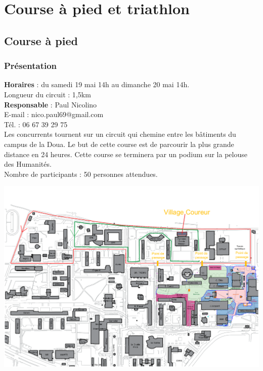 \documentclass[hidelinks, paper=a4, fontsize=13pt]{report}
\begin{document}
\section{Course à pied et triathlon}
\subsection{Course à pied}

\subsubsection{Présentation}
\textbf{Horaires} : du samedi 19 mai 14h au dimanche 20 mai 14h.\\

Longueur du circuit : 1,5km\\

\textbf{Responsable} : Paul Nicolino\\
	E-mail : nico.paul69@gmail.com\\
	Tél. : 06 67 39 29 75\\

Les concurrents tournent sur un circuit qui chemine entre les bâtiments du campus de la Doua. Le but de cette course est de parcourir la plus grande distance en 24 heures. Cette course se terminera par un podium sur la pelouse des Humanités. \\

Nombre de participants : 50 personnes attendues.\\


\begin{center}
\includegraphics[width=.8\textwidth,keepaspectratio]{Exports/Plan_24h_45eme-Parcours_courses}
\end{center}
\end{document}
